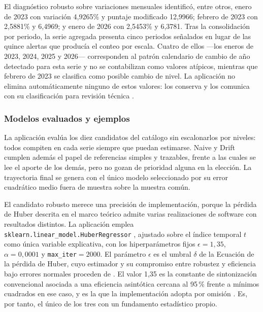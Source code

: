 \documentclass[12pt,letterpaper]{article}
\providecommand{\parencite}{\citep}
\providecommand{\textcite}{\citet}
\begin{document}
El diagnóstico robusto sobre variaciones mensuales identificó, entre otros, enero de 2023 con variación 4,9265\% y puntaje modificado 12,9966; febrero de 2023 con 2,5881\% y 6,4969; y enero de 2026 con 2,5453\% y 6,3781. Tras la consolidación por periodo, la serie agregada presenta cinco periodos señalados en lugar de las quince alertas que producía el conteo por escala. Cuatro de ellos ---los eneros de 2023, 2024, 2025 y 2026--- corresponden al patrón calendario de cambio de año detectado para esta serie y no se contabilizan como valores atípicos, mientras que febrero de 2023 se clasifica como posible cambio de nivel. La aplicación no elimina automáticamente ninguno de estos valores: los conserva y los comunica con su clasificación para revisión técnica \parencite{nist_outliers}.

\subsubsection{Modelos evaluados y ejemplos}

La aplicación evalúa los diez candidatos del catálogo sin escalonarlos por niveles: todos compiten en cada serie siempre que puedan estimarse. Naive y Drift cumplen además el papel de referencias simples y trazables, frente a las cuales se lee el aporte de los demás, pero no gozan de prioridad alguna en la elección. La trayectoria final se genera con el único modelo seleccionado por su error cuadrático medio fuera de muestra sobre la muestra común.

El candidato robusto merece una precisión de implementación, porque la pérdida de Huber descrita en el marco teórico admite varias realizaciones de software con resultados distintos. La aplicación emplea \texttt{sklearn.linear\_model.HuberRegressor} \parencite{sklearn_huberregressor,pedregosa2011}, ajustado sobre el índice temporal \(t\) como única variable explicativa, con los hiperparámetros fijos \(\epsilon=1{,}35\), \(\alpha=0{,}0001\) y \texttt{max\_iter}\(=2000\). El parámetro \(\epsilon\) es el umbral \(\delta\) de la Ecuación de la pérdida de Huber, cuyo estimador y su compromiso entre robustez y eficiencia bajo errores normales proceden de \textcite{huber1964}. El valor 1,35 es la constante de sintonización convencional asociada a una eficiencia asintótica cercana al 95\,\% frente a mínimos cuadrados en ese caso, y es la que la implementación adopta por omisión \parencite{sklearn_huberregressor}. Es, por tanto, el único de los tres con un fundamento estadístico propio.
\end{document}
